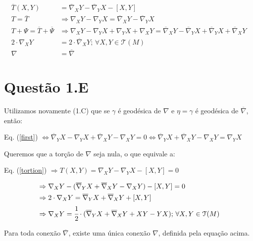 \documentclass[10pt,a4paper]{article}
\begin{document}
		\begin{align*}
		\overline{T}(X, Y) &= \overline{\nabla}_X Y - \overline{\nabla}_Y X - [X, Y] \\
		T = \overline{T} &\Rightarrow \nabla_X Y - \nabla_Y X = \overline{\nabla}_X Y - \overline{\nabla}_Y X \\
		T + \Psi = \overline{T} + \overline{\Psi} &\Rightarrow \nabla_X Y - \nabla_Y X + \nabla_Y X + \nabla_X Y = \overline{\nabla}_X Y - \overline{\nabla}_Y X + \overline{\nabla}_Y X + \overline{\nabla}_X Y \\
		2 \cdot \nabla_X Y &= 2 \cdot \overline{\nabla}_X Y; \, \forall X, Y \in \mathcal{T}(M) \\
		\nabla &= \overline{\nabla}
		\end{align*}

		\vspace{12mm}

	\section{Quest\~ao 1.E}
		\begin{flushright}
		\end{flushright}

		Utilizamos novamente (1.C) que se $\gamma$ \'e geod\'esica de $\nabla$ e $\eta = \gamma$ \'e geod\'esica de $\overline{\nabla}$, ent\~ao:

		Eq. (\ref{first}) $\Leftrightarrow  \overline{\nabla}_Y X - \nabla_Y X + \overline{\nabla}_X Y - \nabla_X Y = 0 \Leftrightarrow  \overline{\nabla}_Y X + \overline{\nabla}_X Y - \nabla_X Y = \nabla_Y X$

		Queremos que a tor\c{c}\~ao de $\nabla$ seja nula, o que equivale a:

		Eq. (\ref{tortion}) $\Rightarrow T(X, Y) = \nabla_X Y - \nabla_Y X - [X, Y] = 0$

		\begin{align*}
		  &\Rightarrow \nabla_X Y - (\overline{\nabla}_Y X + \overline{\nabla}_X Y - \nabla_X Y) - [X, Y] = 0 \\
		  &\Rightarrow 2 \cdot \nabla_X Y = \overline{\nabla}_Y X + \overline{\nabla}_X Y + [X, Y] \\
		  &\Rightarrow \nabla_X Y = \cfrac{1}{2} \cdot (\overline{\nabla}_Y X + \overline{\nabla}_X Y + XY - YX); \, \forall X, Y \in \mathcal{T}(M)
		\end{align*}

		Para toda conex\~ao $\overline{\nabla}$, existe uma \'unica conex\~ao $\nabla$, definida pela equa\c{c}\~ao acima.
\end{document}
